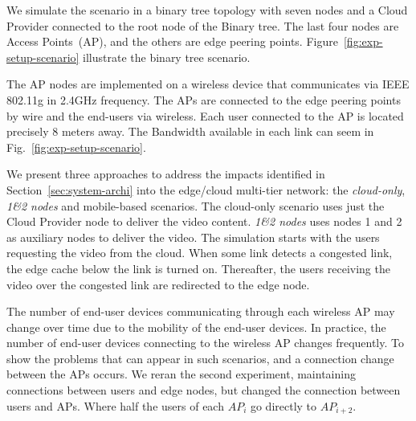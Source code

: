 

We simulate the scenario in a binary tree topology with seven nodes and a Cloud Provider connected to the root node of the Binary tree. The last four nodes are Access Points~(AP), and the others are edge peering points. Figure~\ref{fig:exp-setup-scenario} illustrate the binary tree scenario.

The AP nodes are implemented on a wireless device that communicates via IEEE 802.11g in 2.4GHz frequency. The APs are connected to the edge peering points by wire and the end-users via wireless. Each user connected to the AP is located precisely 8 meters away. The Bandwidth available in each link can seem in Fig.~\ref{fig:exp-setup-scenario}.

We present three approaches to address the impacts identified in Section~\ref{sec:system-archi} into the edge/cloud multi-tier network: the \textit{cloud-only}, \textit{1\&2 nodes} and mobile-based scenarios. The cloud-only scenario uses just the Cloud Provider node to deliver the video content. \textit{1\&2 nodes} uses nodes 1 and 2 as auxiliary nodes to deliver the video. The simulation starts with the users requesting the video from the cloud. When some link detects a congested link, the edge cache below the link is turned on. Thereafter, the users receiving the video over the congested link are redirected to the edge node. 

The number of end-user devices communicating through each wireless AP may change over time due to the mobility of the end-user devices. In practice, the number of end-user devices connecting to the wireless AP changes frequently. 
To show the problems that can appear in such scenarios, and a connection change between the APs occurs. We reran the second experiment, maintaining connections between users and edge nodes, but changed the connection between users and APs. Where half the users of each $AP_{i}$ go directly to $AP_{i + 2}$.


